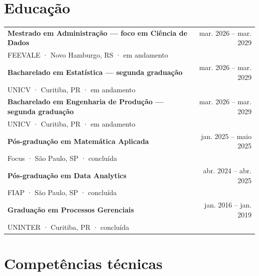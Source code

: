 \documentclass[10pt,a4paper]{article}
\begin{document}
\section{Educação}

\begin{tabularx}{\textwidth}{@{}Xr@{}}
\textbf{Mestrado em Administração — foco em Ciência de Dados} & mar. 2026 – mar. 2029\\
FEEVALE · Novo Hamburgo, RS · em andamento &\\[3pt]
\textbf{Bacharelado em Estatística — segunda graduação} & mar. 2026 – mar. 2029\\
UNICV · Curitiba, PR · em andamento &\\[3pt]
\textbf{Bacharelado em Engenharia de Produção — segunda graduação} & mar. 2026 – mar. 2029\\
UNICV · Curitiba, PR · em andamento &\\[3pt]
\textbf{Pós-graduação em Matemática Aplicada} & jan. 2025 – maio 2025\\
Focus · São Paulo, SP · concluída &\\[3pt]
\textbf{Pós-graduação em Data Analytics} & abr. 2024 – abr. 2025\\
FIAP · São Paulo, SP · concluída &\\[3pt]
\textbf{Graduação em Processos Gerenciais} & jan. 2016 – jan. 2019\\
UNINTER · Curitiba, PR · concluída &
\end{tabularx}

\section{Competências técnicas}
\end{document}
